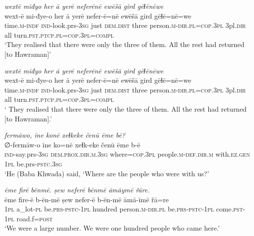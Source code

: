 \ea \label{BP.107}
\textit{wextē miđyo her ā yerē neferēnē ewēšā gird gēɫēnēwe} \\ 
\gll wext-ē mi-đye-o her ā yerē nefer-ē=nē ewēšā gird gēɫē=nē=we \\ 
 time\textsc{.m}\textsc{-indf} \textsc{ind-}look.prs\textsc{-3sg} just \textsc{dem.dist} three person\textsc{.m}\textsc{-dir}\textsc{.pl}\textsc{=cop}\textsc{.3pl} 3pl\textsc{.dir} all turn\textsc{.pst}\textsc{.ptcp}\textsc{.pl}\textsc{=cop}\textsc{.3pl}\textsc{=compl} \\ 
\glt `They realised that there were only the three of them. All the rest had returned [to Hawraman]'
\z 
 
\ea \label{BP.108}
\textit{wextē miđyo her ā yerē neferēnē ewēšā gird gēɫēnēwe} \\ 
\gll wext-ē mi-đye-o her ā yerē nefer-ē=nē ewēšā gird gēɫē=nē=we \\ 
 time\textsc{.m}\textsc{-indf} \textsc{ind-}look.prs\textsc{-3sg} just \textsc{dem.dist} three person\textsc{.m}\textsc{-dir}\textsc{.pl}\textsc{=cop}\textsc{.3pl} 3pl\textsc{.dir} all turn\textsc{.pst}\textsc{.ptcp}\textsc{.pl}\textsc{=cop}\textsc{.3pl}\textsc{=compl} \\ 
\glt ` They realised that there were only the three of them. All the rest had returned [to Hawraman].'
\z 
 
\ea \label{BP.109}
\textit{fermāwo, īne konē xeɫkeke čenū ēme bē?} \\ 
\gll ∅-fermāw-o īne ko=nē xeɫk-eke čenū ēme b-ē \\ 
 \textsc{ind-}say.prs\textsc{-3sg} \textsc{dem.prox}\textsc{.dir}\textsc{.m}\textsc{.3sg} where\textsc{=cop}\textsc{.3pl} people\textsc{.m}\textsc{-def}\textsc{.dir}\textsc{.m} with\textsc{.ez.gen} \textsc{1pl} be.prs\textsc{-pstc}\textsc{.3sg} \\ 
\glt `He (Baba Khwada) said, ‘Where are the people who were with us?'
\z 
 
\ea \label{BP.110}
\textit{ēme firē bēnmē. ṣew neferē bēnmē āmāymē řāre.} \\ 
\gll ēme fire-ē b-ēn-mē ṣew nefer-ē b-ēn-mē āmā-īmē řā=re \\ 
 \textsc{1pl} a\_lot\textsc{-pl} be.\textsc{prs}\textsc{-pstc}\textsc{-\textsc{1pl}} hundred person\textsc{.m}\textsc{-dir.pl} be.\textsc{prs}\textsc{-pstc}\textsc{-\textsc{1pl}} come\textsc{.pst}-\textsc{1pl} road.f\textsc{=\textsc{post}} \\ 
\glt `We were a large number. We were one hundred  people who came here.'
\z 
 
